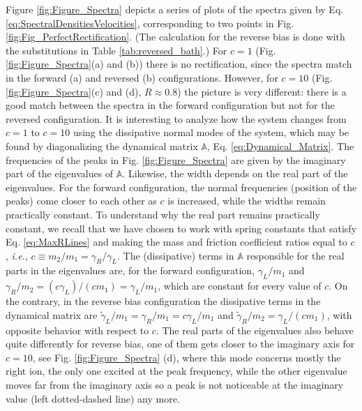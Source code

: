 %
Figure \ref{fig:Figure_Spectra} depicts a series of plots of the spectra given by Eq. \eqref{eq:SpectralDensitiesVelocities}, corresponding to two points in Fig. \ref{fig:Fig_PerfectRectification}. (The calculation for the reverse bias is done with the substitutions in Table \ref{tab:reversed_bath}.)
For $c=1$ (Fig. \ref{fig:Figure_Spectra}(a) and (b)) there is no rectification, since the spectra match in the forward (a) and reversed (b) configurations. However, for $c=10$ (Fig. \ref{fig:Figure_Spectra}(c) and (d), $R\approx 0.8$) the picture is very different: there is a good match between the spectra in the forward configuration but not for the reversed configuration. It is interesting to analyze how the system changes from $c=1$ to $c=10$
using the dissipative normal modes of the system, which may be found by diagonalizing the dynamical matrix $\mathbb{A}$, Eq. \eqref{eq:Dynamical_Matrix}. The frequencies of the peaks in Fig. \ref{fig:Figure_Spectra} are given by the imaginary part of the eigenvalues of $\mathbb{A}$. Likewise, the width depends on  the real part of the eigenvalues. For the forward configuration, the normal frequencies (position of the peaks) come closer to each other as $c$ is increased, while the widths remain practically constant. To understand why the real part remains practically constant, we recall that we have chosen to work with spring constants that satisfy Eq. \eqref{eq:MaxRLines} and making the mass and friction coefficient ratios equal to $c$, \textit{i.e.}, $ c\equiv m_2/m_1 = \gamma_R/\gamma_L$. The (dissipative) terms in $\mathbb{A}$ responsible for the real parts in the eigenvalues are,
for the forward configuration,  $\gamma_L/m_1$ and $\gamma_R/m_2 = (c \gamma_L)/(c m_1) = \gamma_L/m_1$, which are constant for every value of $c$. On the contrary, in the reverse bias configuration  the dissipative terms in the dynamical matrix  are $\tilde{\gamma}_L/m_1 = \gamma_R/m_1 = c\gamma_L/m_1$ and $\tilde{\gamma}_R/m_2 = \gamma_L/ (c m_1)$, with opposite behavior with respect to $c$. The real parts of the eigenvalues
also behave quite differently for reverse bias, one of them gets closer to the imaginary axis for $c=10$,
see Fig. \ref{fig:Figure_Spectra} (d), where this mode  concerns mostly the right ion,
the only one excited at the peak frequency, while the other eigenvalue  moves far from the imaginary axis so a peak is not noticeable
at the imaginary value (left dotted-dashed line) any more.


